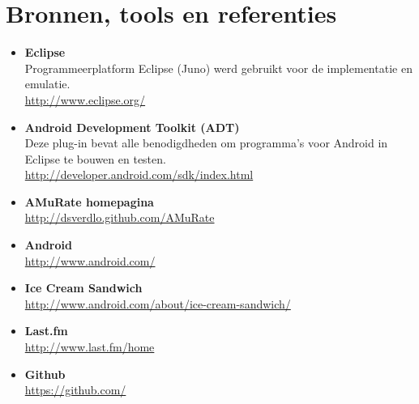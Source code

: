 \documentclass[11pt,a4paper]{article}
\begin{document}
	
	
\section{Bronnen, tools en referenties}

	\begin{itemize}
			
	\item \textbf{Eclipse} \\
	Programmeerplatform Eclipse (Juno) werd gebruikt voor de implementatie en emulatie.	\\
	\url{http://www.eclipse.org/}

	\item \textbf{Android Development Toolkit (ADT)} \\
	Deze plug-in bevat alle benodigdheden om programma's voor Android in Eclipse te bouwen en testen.\\
	\url{http://developer.android.com/sdk/index.html}

	\item \textbf{AMuRate homepagina} \\
		\url{http://dsverdlo.github.com/AMuRate}
		
	\item \textbf{Android} \\
		\url{http://www.android.com/}
		
	\item \textbf{Ice Cream Sandwich} \\
		\url{http://www.android.com/about/ice-cream-sandwich/}	
		
	\item \textbf{Last.fm} \\
		\url{http://www.last.fm/home}	
		
	\item \textbf{Github} \\
		\url{https://github.com/}



	\end{itemize}
\end{document}
